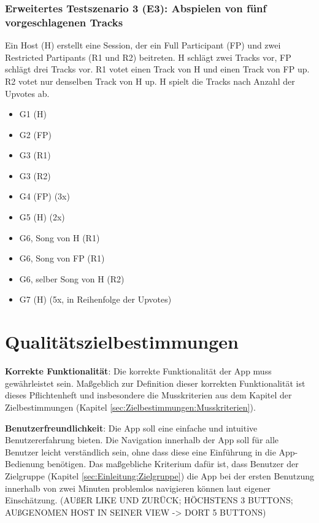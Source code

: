 \documentclass[oneside, ngerman]{sdqtechreport}
\begin{document}
\subsection{Erweitertes Testszenario 3 (E3): Abspielen von fünf vorgeschlagenen Tracks}
\label{subsec:Tests:ErweiterteTestszenarien:E3}
Ein Host (H) erstellt eine Session, der ein Full Participant (FP) und zwei Restricted Partipants (R1 und R2) beitreten. H schlägt zwei Tracks vor, FP schlägt drei Tracks vor. R1 votet einen Track von H und einen Track von FP up. R2 votet nur denselben Track von H up. H spielt die Tracks nach Anzahl der Upvotes ab.
\begin{itemize}
    \item G1 (H)
    \item G2 (FP)
    \item G3 (R1)
    \item G3 (R2)
    \item G4 (FP) (3x)
    \item G5 (H) (2x)
    \item G6, Song von H (R1)
    \item G6, Song von FP (R1)
    \item G6, selber Song von H (R2)
    \item G7 (H) (5x, in Reihenfolge der Upvotes)
\end{itemize}


\chapter{Qualitätszielbestimmungen}
\label{chap:Qualitätszielbestimmungen}

\textbf{Korrekte Funktionalität}: Die korrekte Funktionalität der App muss gewährleistet sein. Maßgeblich zur Definition dieser korrekten Funktionalität ist dieses Pflichtenheft und insbesondere die Musskriterien aus dem Kapitel der Zielbestimmungen (Kapitel \ref{sec:Zielbestimmungen:Musskriterien}).

\textbf{Benutzerfreundlichkeit}: Die App soll eine einfache und intuitive Benutzererfahrung bieten. Die Navigation innerhalb der App soll für alle Benutzer leicht verständlich sein, ohne dass diese eine Einführung in die App-Bedienung benötigen. Das maßgebliche Kriterium dafür ist, dass Benutzer der Zielgruppe (Kapitel \ref{sec:Einleitung:Zielgruppe}) die App bei der ersten Benutzung innerhalb von zwei Minuten problemlos navigieren können laut eigener Einschätzung. (AUßER LIKE UND ZURÜCK; HÖCHSTENS 3 BUTTONS; AUßGENOMEN HOST IN SEINER VIEW -> DORT 5 BUTTONS)
\label{Qualitätszielbestimmungen_Benutzerfreundlichkeit}
\end{document}
